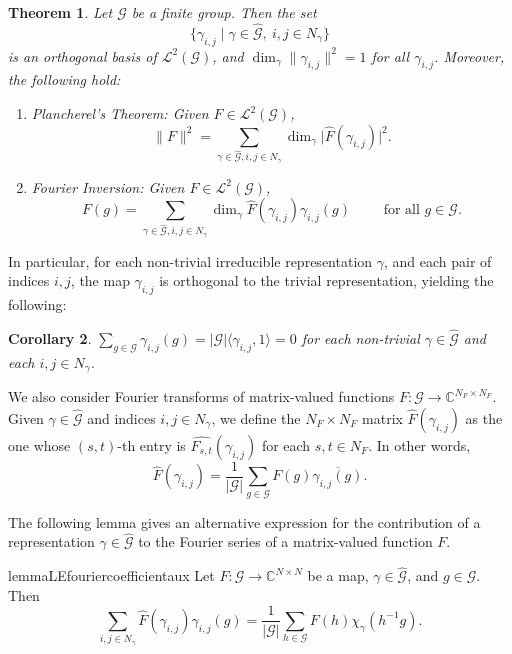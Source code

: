 \documentclass[a4paper,11pt]{article}
\newtheorem{theorem}{Theorem}[section]
\newtheorem{corollary}[theorem]{Corollary}
\theoremstyle{definition}
\newcommand{\cc}{\mathbb{C}}
\newcommand{\gr}{\mathscr{G}}
\newcommand{\triv}{1}
\begin{document}
\begin{theorem}
\label{th:orthogonal_representations}
    Let $\gr$ be a finite group. Then the set 
    \[
    \{
    \gamma_{i,j} \mid \gamma\in \widehat{\gr}, \ i,j \in N_\gamma
    \} \]
    is an orthogonal basis of $\mathcal{L}^2(\gr)$, and  $\dim_\gamma \lVert \gamma_{i,j} \rVert^2=1$ for all $\gamma_{i,j}$. Moreover, the following hold:
    \begin{enumerate}
    \item \emph{Plancherel's Theorem:} Given $F\in \mathcal{L}^2(\gr)$,
    \[
    \lVert F \rVert^2 = 
    \sum_{\gamma\in \widehat{\gr}, i,j\in 
    N_\gamma} \dim_\gamma \vert\widehat{F}(\gamma_{i,j}) \vert^2.
    \]
    \item \emph{Fourier Inversion:} Given $F\in \mathcal{L}^2(\gr)$,
    \[
    F(g) = \sum_{\gamma\in \widehat{\gr}, i,j\in 
    N_\gamma} \dim_\gamma \widehat{F}(\gamma_{i,j}) \gamma_{i,j}(g) \qquad  \text{ for all }g\in \gr.
    \]
\end{enumerate}
\end{theorem}


In particular, for each non-trivial irreducible representation $\gamma$, and each pair of indices $i,j$, the map $\gamma_{i,j}$ is orthogonal to the trivial representation, yielding the following:
\begin{corollary} \label{cor:group-sum-zero}
         $\sum_{g \in \gr} \gamma_{i,j}(g) = |\gr| \langle \gamma_{i,j}, \triv \rangle  = 0$ for each non-trivial $\gamma \in \widehat{\gr}$ and each $i,j \in N_\gamma$.
\end{corollary}

We also consider Fourier transforms of matrix-valued functions $F:\gr \rightarrow \cc^{N_F\times N_F}$. Given $\gamma\in \widehat{\gr}$ and indices $i,j\in N_\gamma$, we define the $N_F\times N_F$ matrix $\widehat{F}(\gamma_{i,j})$ as the one whose $(s,t)$-th entry is
$\widehat{F_{s,t}}(\gamma_{i,j})$ for each $s,t\in N_F$. In other words,
\[
\widehat{F}(\gamma_{i,j})= \frac{1}{|\gr|} \sum_{g\in \gr} F(g) \overline{\gamma_{i,j}(g)}.
\]

The following lemma gives an alternative expression for the contribution of a representation $\gamma \in \widehat{\gr}$
to the Fourier series of a matrix-valued function $F$.

\begin{restatable}{lemma}{LEfouriercoefficientaux}\label{le:fourier_coefficient_aux}
    Let $F:\gr \rightarrow \cc^{N\times N}$ be a map, $\gamma\in \widehat{\gr}$,   
    and $g\in \gr$. Then
    \[
    \sum_{i,j\in N_\gamma} \widehat{F}(\gamma_{i,j}) \gamma_{i,j}(g) =
    \frac{1}{|\gr|} \sum_{h\in \gr} F(h) \chi_\gamma(h^{-1}g).
    \]
\end{restatable}
\end{document}
